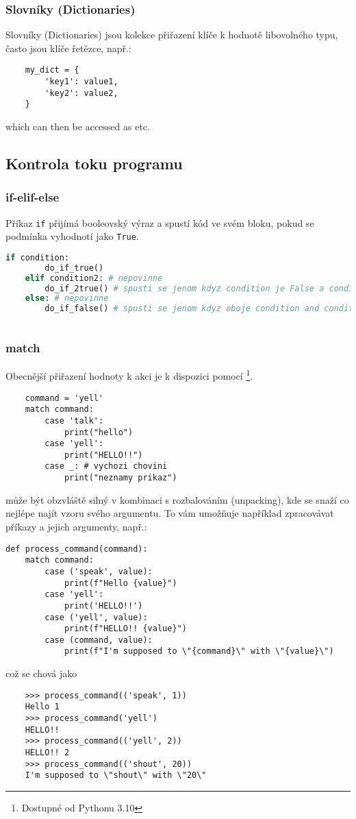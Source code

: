 \subsubsection{Slovníky (Dictionaries)}
Slovníky (Dictionaries) jsou kolekce přiřazení klíče k hodnotě libovolného typu, často jsou klíče řetězce, např.:
\begin{lstlisting}
    my_dict = {
        'key1': value1,
        'key2': value2,
    }
\end{lstlisting}
which can then be accessed as  etc.

\subsection{Kontrola toku programu}

\subsubsection{if-elif-else}
Příkaz \verb|if| přijímá booleovský výraz a spustí kód ve svém bloku, pokud se podmínka vyhodnotí jako \verb|True|.
\begin{lstlisting}[language=Python]
    if condition:
        do_if_true()
    elif condition2: # nepovinne
        do_if_2true() # spusti se jenom kdyz condition je False a condition2 je True
    else: # nepovinne
        do_if_false() # spusti se jenom kdyz oboje condition and condition2 jsou False
        
\end{lstlisting}

\subsubsection{match}
Obecnější přiřazení hodnoty k akci je k dispozici pomocí \footnote{Dostupné od Pythonu 3.10}. 
\begin{lstlisting}
    command = 'yell'
    match command:
        case 'talk':
            print("hello")
        case 'yell':
            print("HELLO!!")
        case _: # vychozi chovini
            print("neznamy prikaz")
\end{lstlisting}

 může být obzvláště silný v kombinaci s rozbalováním (unpacking), kde se  snaží co nejlépe najít vzoru svého argumentu. To vám umožňuje například zpracovávat příkazy a jejich argumenty, např.:
\begin{lstlisting}
def process_command(command):
    match command:
        case ('speak', value):
            print(f"Hello {value}")
        case 'yell':
            print('HELLO!!')
        case ('yell', value):
            print(f"HELLO!! {value}")
        case (command, value):
            print(f"I'm supposed to \"{command}\" with \"{value}\")
\end{lstlisting}
což se chová jako
\begin{lstlisting}
    >>> process_command(('speak', 1))
    Hello 1
    >>> process_command('yell')
    HELLO!!
    >>> process_command(('yell', 2))
    HELLO!! 2
    >>> process_command(('shout', 20))
    I'm supposed to \"shout\" with \"20\"
\end{lstlisting}

